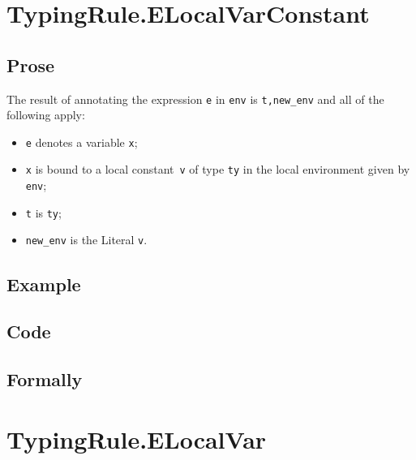 \documentclass{book}
\begin{document}

\section{TypingRule.ELocalVarConstant \label{sec:TypingRule.ELocalVarConstant}}

  \subsection{Prose}
  The result of annotating the expression \texttt{e} in \texttt{env} is
\texttt{t,new\_env} and all of the following apply:
  \begin{itemize}
  \item \texttt{e} denotes a variable \texttt{x};
  \item \texttt{x} is bound to a local constant~\texttt{v} of type \texttt{ty} in the local environment given by \texttt{env};
  \item \texttt{t} is \texttt{ty};
  \item \texttt{new\_env} is the Literal \texttt{v}.
  \end{itemize}

  \subsection{Example}

  \subsection{Code}

\begin{emptyformal}
  \subsection{Formally}
\end{emptyformal}


\section{TypingRule.ELocalVar \label{sec:TypingRule.ELocalVar}}
\end{document}
